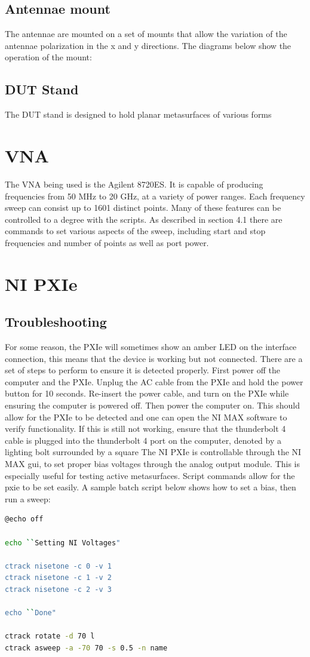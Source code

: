 \documentclass[hidelinks]{article}
\begin{document}
\subsection{Antennae mount}
The antennae are mounted on a set of mounts that allow the variation of the antennae polarization in the x and y directions. The diagrams below show the operation of the mount: 
\subsection{DUT Stand}
The DUT stand is designed to hold planar metasurfaces of various forms
\section{VNA}
The VNA being used is the Agilent 8720ES. It is capable of producing frequencies from 50 MHz to 20 GHz, at a variety of power ranges. Each frequency sweep can consist up to 1601 distinct points. Many of these features can be controlled to a degree with the scripts. As described in section 4.1 there are commands to set various aspects of the sweep, including start and stop frequencies and number of points as well as port power.
\section{NI PXIe}

    \subsection{Troubleshooting}
    For some reason, the PXIe will sometimes show an amber LED on the interface connection, this means that the device is working but not connected. There are a set of steps to perform to ensure it is detected properly. First power off the computer and the PXIe. Unplug the AC cable from the PXIe and hold the power button for 10 seconds. Re-insert the power cable, and turn on the PXIe while ensuring the computer is powered off. Then power the computer on. This should allow for the PXIe to be detected and one can open the NI MAX software to verify functionality. If this is still not working, ensure that the thunderbolt 4 cable is plugged into the thunderbolt 4 port on the computer, denoted by a lighting bolt surrounded by a square
The NI PXIe is controllable through the NI MAX gui, to set proper bias voltages through the analog output module. This is especially useful for testing active metasurfaces. Script commands allow for the pxie to be set easily. A sample batch script below shows how to set a bias, then run a sweep:
\begin{lstlisting}[language=bash, caption=Setting multiple NI channels]
@echo off

echo ``Setting NI Voltages"

ctrack nisetone -c 0 -v 1
ctrack nisetone -c 1 -v 2
ctrack nisetone -c 2 -v 3

echo ``Done"

ctrack rotate -d 70 l
ctrack asweep -a -70 70 -s 0.5 -n name
\end{lstlisting}
\end{document}
